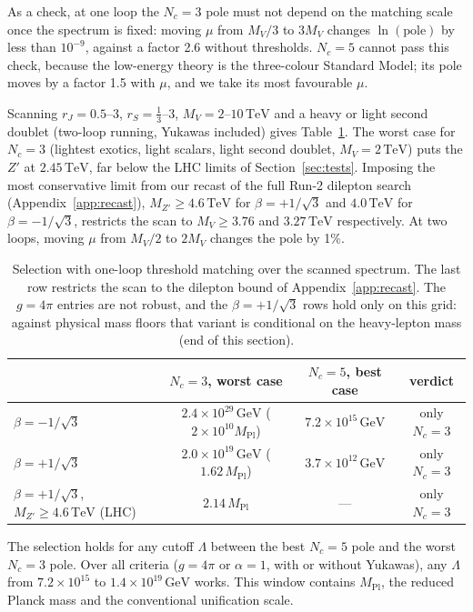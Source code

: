 \documentclass[11pt,a4paper]{article}
\newcommand{\Nc}{N_c}
\newcommand{\MPl}{M_{\mathrm{Pl}}}
\newcommand{\GeV}{\,\mathrm{GeV}}
\newcommand{\TeV}{\,\mathrm{TeV}}
\begin{document}
As a check, at one loop the $\Nc=3$ pole must not depend on the matching scale once the
spectrum is fixed: moving $\mu$ from $M_V/3$ to $3M_V$ changes $\ln(\text{pole})$ by less
than $10^{-9}$, against a factor 2.6 without thresholds. $\Nc=5$ cannot pass this check,
because the low-energy theory is the three-colour Standard Model; its pole moves by a
factor 1.5 with $\mu$, and we take its most favourable $\mu$.

Scanning $r_J=0.5$--$3$, $r_S=\tfrac13$--$3$, $M_V=2$--$10\TeV$ and a heavy or light
second doublet (two-loop running, Yukawas included) gives Table~\ref{tab:thr}. The worst
case for $\Nc=3$ (lightest exotics, light scalars, light second doublet, $M_V=2\TeV$) puts
the $Z'$ at $2.45\TeV$, far below the LHC limits of Section~\ref{sec:tests}. Imposing the most
conservative limit from our recast of the full Run-2 dilepton search
(Appendix~\ref{app:recast}), $M_{Z'}\ge4.6\TeV$ for $\beta=+1/\sqrt3$ and $4.0\TeV$ for
$\beta=-1/\sqrt3$, restricts the scan to $M_V\ge3.76$ and $3.27\TeV$ respectively. At two
loops, moving $\mu$ from $M_V/2$ to $2M_V$ changes the pole by 1\%.

\begin{table}[h]\centering\small
\begin{tabular}{lccc}
\toprule
& $\Nc=3$, worst case & $\Nc=5$, best case & verdict\\
\midrule
$\beta=-1/\sqrt3$ & $2.4\times10^{29}\GeV$ ($2\times10^{10}\MPl$) & $7.2\times10^{15}\GeV$ & only $\Nc=3$\\
$\beta=+1/\sqrt3$ & $2.0\times10^{19}\GeV$ ($1.62\,\MPl$) & $3.7\times10^{12}\GeV$ & only $\Nc=3$\\
$\beta=+1/\sqrt3$, $M_{Z'}\ge4.6\TeV$ (LHC) & $2.14\,\MPl$ & --- & only $\Nc=3$\\
\bottomrule
\end{tabular}
\caption{Selection with one-loop threshold matching over the scanned spectrum. The last
row restricts the scan to the dilepton bound of Appendix~\ref{app:recast}. The
$g=4\pi$ entries are not robust, and the $\beta=+1/\sqrt3$ rows hold only on this grid:
against physical mass floors that variant is conditional on the heavy-lepton mass (end of
this section).}\label{tab:thr}
\end{table}

The selection holds for any cutoff $\Lambda$ between the best $\Nc=5$ pole and the worst
$\Nc=3$ pole. Over all criteria ($g=4\pi$ or $\alpha=1$, with or without Yukawas), any
$\Lambda$ from $7.2\times10^{15}$ to $1.4\times10^{19}\GeV$ works. This window contains
$\MPl$, the reduced Planck mass and the conventional unification scale.
\end{document}
